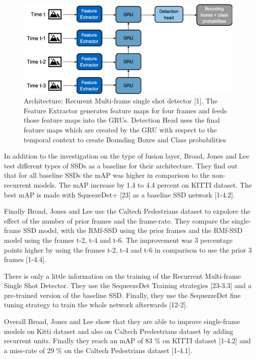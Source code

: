 \documentclass[conference]{IEEEtran}
\begin{document}
\begin{figure} [h]
\includegraphics[width=\columnwidth]{RMFSSD}
\caption{Architecture: Recurent Multi-frame single shot detector [1]. The Feature Extractor generates feature maps for four frames and feeds those feature maps into the GRUs. Detection Head uses the final feature maps which are created by the GRU with respect to the temporal context to create Bounding Boxes and Class probabilities}
\end{figure}

In addition to the investigation on the type of fusion layer, Broad, Jones and Lee test different types of SSDs as a baseline for their architecture. They find out that for all baseline SSDs the mAP was higher in comparison to the non-recurrent models. The mAP increase by 1.4 to 4.4 percent on KITTI dataset.  The best mAP is made with SqueezeDet+ [23] as a baseline SSD network [1-4.2].  \newline

Finally Broad, Jones and Lee use the Caltech Pedestrians dataset to expolore the effect of the number of prior frames and the frame-rate. They compare the single-frame SSD model, with the RMf-SSD using the prior frames and the RMf-SSD model using the frames t-2, t-4 and t-6. The improvement was 3 percentage points higher by using the frames t-2, t-4 and t-6 in comparison to use the prior 3 frames [1-4.4]. \newline  

There is only a little information on the training of the Recurrent Multi-frame Single Shot Detector. They use the SequeezeDet Training strategies [23-3.3] and a pre-trained version of the baseline SSD. Finally, they use the SequezzeDet fine tuning strategy to train the whole network afterwards [12-2]. \newline

Overall Broad, Jones and Lee show that they are able to improve single-frame models on Kitti dataset and also on Caltech Predestrians dataset by adding recurrent units. Finally they reach an mAP of 83 \% on KITTI dataset [1-4.2] and a miss-rate of 29 \% on the Caltech Pedestrians dataset [1-4.1]. \newline
\end{document}
